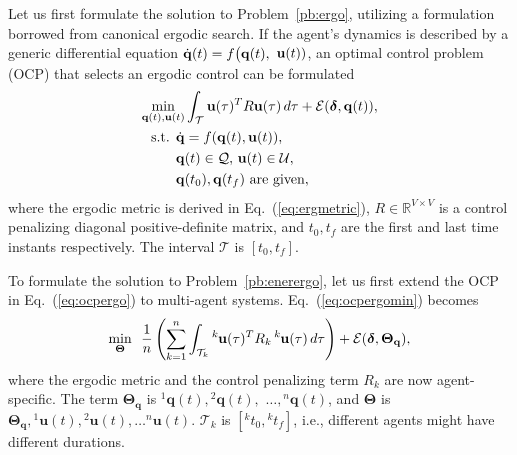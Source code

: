 \documentclass[letterpaper,10pt,conference,twoside]{IEEEtran}
\theoremstyle{definition}
\begin{document}
Let us first formulate the solution to Problem~\ref{pb:ergo}, utilizing a formulation borrowed from canonical ergodic search.
If the agent's dynamics is described by a generic differential equation $\dot{\mathbf{q}}(t)=f\big({\small\mathbf{q}(t),}$ ${\small\mathbf{u}(t)})$, an optimal control problem (OCP) that selects an ergodic control can be formulated~\cite{ayvali2017ergodic}
\begin{subequations}\vspace*{-.4cm}\label{eq:ocpergo}\begin{align}
  \min_{\mathbf{q}(t),\mathbf{u}(t)}&\int_{\mathcal{T}}\mathbf{u}(\tau)^TR\mathbf{u}(\tau)\,d\tau+{\mathcal{E}(\boldsymbol{\delta},\mathbf{q}(t))},\label{eq:ocpergomin}\\
  \text{s.t. }\dot{\mathbf{q}}&=f(\mathbf{q}(t),\mathbf{u}(t)),\\
  \mathbf{q}&(t)\in\mathcal{Q},\,\mathbf{u}(t)\in\mathcal{U},\\
  \mathbf{q}&(t_0), \mathbf{q}(t_f)\text{ are given},\label{eq:ocpconsttotf}
\end{align}\end{subequations}
where the ergodic metric is derived in Eq.~(\ref{eq:ergmetric}), $R\in\mathbb{R}^{V\times V}$ is a control penalizing diagonal positive-definite matrix, and $t_0, t_f$ are the first and last time instants respectively. 
The interval $\mathcal{T}$ is $[t_0, t_f]$.%

To formulate the solution to Problem~\ref{pb:enerergo}, let us first extend the OCP in Eq.~(\ref{eq:ocpergo}) to multi-agent systems. Eq.~(\ref{eq:ocpergomin}) becomes
\begin{equation}\label{eq:ocpergomulti}
  \min_{\boldsymbol{\Theta}}\,\,\,{\frac{1}{n}\left(\sum_{k=1}^{n}\int_{\mathcal{T}_k}{}^k\hspace*{-.1ex}\mathbf{u}(\tau)^TR_k\,{}^k\hspace*{-.1ex}\mathbf{u}(\tau)\,d\tau\right)+\mathcal{E}(\boldsymbol{\delta},\boldsymbol{\Theta}_{\mathbf{q}})},
\end{equation}
where the ergodic metric and the control penalizing term $R_k$ are now agent-specific. The term $\boldsymbol{\Theta}_{\mathbf{q}}$ is ${}^1\mathbf{q}(t),{}^2\mathbf{q}(t),$ $\dots,{}^n\mathbf{q}(t)$, and $\boldsymbol{\Theta}$ is $\boldsymbol{\Theta}_{\mathbf{q}},{}^1\mathbf{u}(t),{}^2\mathbf{u}(t),\dots{}^n\mathbf{u}(t)$. $\mathcal{T}_k$ is $[{}^kt_0, {}^kt_f]$, i.e., different agents might have different durations.
\end{document}
